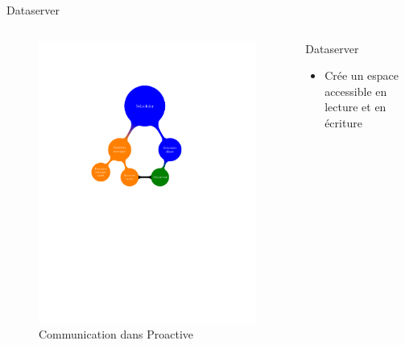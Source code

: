 \documentclass{beamer}
\begin{document}
\begin{frame}{Dataserver}
	\begin{columns}
	\begin{column}[l]{0.5\linewidth}
        \begin{figure}
            \centering
            \includegraphics[trim=4cm 13cm 2cm 5cm,scale=0.48]{netmap_abs.pdf}
            \caption{Communication dans Proactive}
        \end{figure}
	\end{column}
	\begin{column}[r]{0.5\linewidth}
        \begin{exampleblock}{Dataserver}
            \begin{itemize}
                \item Crée un espace accessible en lecture et en écriture


\end{itemize}
\end{exampleblock}
\end{column}
\end{columns}
\end{frame}
\end{document}
